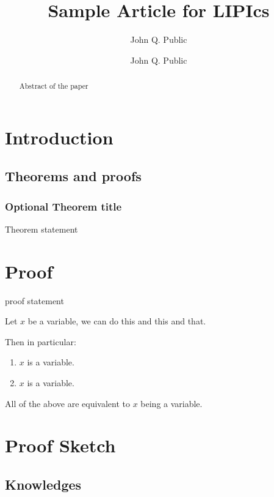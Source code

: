 \documentclass[a4paper,anonymous,UKenglish,cleveref,autoref,thm-restate]{lipics-v2021}
\title{Sample Article for LIPIcs}
\author{John Q. Public}{Dummy University Computing
Laboratory}{dummy-email}{dummy-orcid}{}
\author{John Q. Public}{Dummy University Computing
Laboratory}{dummy-email}{dummy-orcid}{some funding}
\newcommand{\tightlist}{%
    \setlength{\itemsep}{0pt}\setlength{\parskip}{0pt}\setlength{\parsep}{0pt} %
}
\begin{document}
\maketitle

\begin{abstract}
    Abstract of the paper
\end{abstract}


\section{Introduction}\label{introduction}

\subsection{Theorems and proofs}\label{theorems-and-proofs}

\subsubsection{Optional Theorem title}\label{optional-theorem-title}

Theorem statement

\section{Proof}\label{proof}

proof statement

\label{firstclaimlabel}
Let \(x\) be a variable, we can do this and this and that.

Then in particular:

\begin{enumerate}
\def\labelenumi{\roman{enumi}.}
\tightlist
\item
  \(x\) is a variable.
\item
  \(x\) is a variable.
\end{enumerate}

All of the above are equivalent to \(x\) being a variable.

\section{Proof Sketch}\label{proof-sketch}

\subsection{Knowledges}\label{knowledges}
\end{document}
